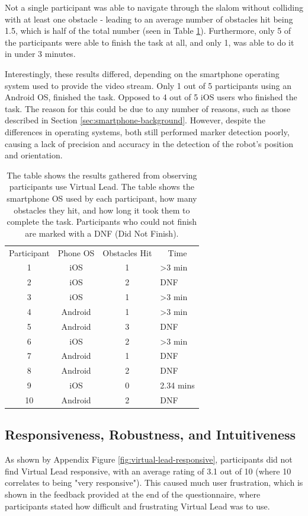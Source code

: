 \documentclass{l4proj}
\begin{document}
Not a single participant was able to navigate through the slalom without colliding with at least one obstacle - leading to an average number of obstacles hit being 1.5, which is half of the total number (seen in Table \ref{tab:virtual-lead-times}). Furthermore, only 5 of the participants were able to finish the task at all, and only 1, was able to do it in under 3 minutes.

Interestingly, these results differed, depending on the smartphone operating system used to provide the video stream. Only 1 out of 5 participants using an Android OS, finished the task. Opposed to 4 out of 5 iOS users who finished the task. The reason for this could be due to any number of reasons, such as those described in Section \ref{sec:smartphone-background}.  However, despite the differences in operating systems, both still performed marker detection poorly, causing a lack of precision and accuracy in the detection of the robot's position and orientation.

\begin{table}[]
\centering
\caption{The table shows the results gathered from observing participants use Virtual Lead. The table shows the smartphone OS used by each participant, how many obstacles they hit, and how long it took them to complete the task. Participants who could not finish are marked with a DNF (Did Not Finish).}
\label{tab:virtual-lead-times}
\begin{tabular}{cccl}
Participant & Phone OS & Obstacles Hit & \multicolumn{1}{c}{Time} \\
1 & iOS & 1 & \textgreater{}3 min \\
2 & iOS & 2 & DNF \\
3 & iOS & 1 & \textgreater{}3 min \\
4 & Android & 1 & \textgreater{}3 min \\
5 & Android & 3 & DNF \\
6 & iOS & 2 & \cellcolor[HTML]{FFFFFF}\textgreater{}3 min \\
7 & Android & 1 & DNF \\
8 & Android & 2 & DNF \\
9 & iOS & 0 & 2.34 mins \\
10 & Android & 2 & DNF
\end{tabular}
\end{table}


\subsection{Responsiveness, Robustness, and Intuitiveness}
As shown by Appendix Figure \ref{fig:virtual-lead-responsive}, participants did not find Virtual Lead responsive, with an average rating of 3.1 out of 10 (where 10 correlates to being "very responsive"). This caused much user frustration, which is shown in the feedback provided at the end of the questionnaire, where participants stated how difficult and frustrating Virtual Lead was to use.
\end{document}
